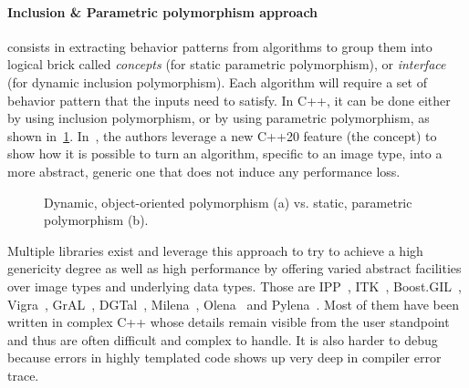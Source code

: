 \paragraph{Inclusion \& Parametric polymorphism approach} consists in extracting behavior patterns from algorithms to
group them into logical brick called \emph{concepts} (for static parametric polymorphism), or \emph{interface} (for
dynamic inclusion polymorphism). Each algorithm will require a set of behavior pattern that the inputs need to satisfy.
In C++, it can be done either by using inclusion polymorphism, or by using parametric polymorphism, as shown
in~\ref{fig.gen.inclupoly}. In~\cite{roynard.2019.rrpr}, the authors leverage a new C++20 feature (the concept) to show
how it is possible to turn an algorithm, specific to an image type, into a more abstract, generic one that does not
induce any performance loss.

\begin{figure}[htb]
  \centering
  \hfil
  \vfil
  \hfil
  \caption{Dynamic, object-oriented polymorphism (a) vs. static, parametric polymorphism (b).}
  \label{fig.gen.inclupoly}
\end{figure}

Multiple libraries exist and leverage this approach to try to achieve a high genericity degree as well as high
performance by offering varied abstract facilities over image types and underlying data types. Those are
IPP~\cite{taylor.2004.intel}, ITK~\cite{johnson.2013.ITKSoftwareGuideThirdEdition}, Boost.GIL~\cite{bourdev.2006.bgil},
Vigra~\cite{kothe.2011.generic}, GrAL~\cite{berti.2006.gral}, DGTal~\cite{coeurjolly.2016.dgtal},
Milena~\cite{levillain.2009.ismm,levillain.2010.icip},
Olena~\cite{olena.2000.www,levillain.2011.phd,geraud.2012.hdr,levillain.2014.ciarp} and
Pylena~\cite{carlinet.2018.pylena}. Most of them have been written in complex C++ whose details remain visible from the
user standpoint and thus are often difficult and complex to handle. It is also harder to debug because errors in highly
templated code shows up very deep in compiler error trace.

